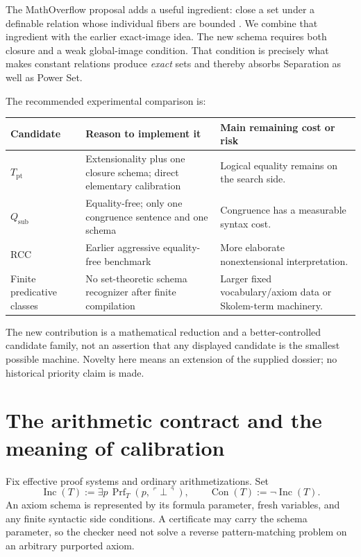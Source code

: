 \documentclass[11pt,letterpaper]{article}
\theoremstyle{definition}\newtheorem{definition}[theorem]{Definition}
\theoremstyle{remark}\newtheorem{remark}[theorem]{Remark}
\newcommand{\Con}{\operatorname{Con}}
\newcommand{\Inc}{\operatorname{Inc}}
\newcommand{\Prf}{\operatorname{Prf}}
\newcommand{\Tpt}{T_{\mathrm{pt}}}
\newcommand{\QTsub}{Q_{\mathrm{sub}}}
\begin{document}
The MathOverflow proposal adds a useful ingredient: close a set under a
definable relation whose individual fibers are bounded \cite{mo}.
We combine that ingredient with the earlier exact-image idea. The new
schema requires both closure and a weak global-image condition. That
condition is precisely what makes constant relations produce \emph{exact}
sets and thereby absorbs Separation as well as Power Set.

The recommended experimental comparison is:
\begin{center}
\begin{tabular}{p{.19\linewidth}p{.34\linewidth}p{.37\linewidth}}
\toprule
Candidate & Reason to implement it & Main remaining cost or risk\\
\midrule
$\Tpt$ & Extensionality plus one closure schema; direct elementary calibration & Logical equality remains on the search side.\\
$\QTsub$ & Equality-free; only one congruence sentence and one schema & Congruence has a measurable syntax cost.\\
RCC & Earlier aggressive equality-free benchmark & More elaborate nonextensional interpretation.\\
Finite predicative classes & No set-theoretic schema recognizer after finite compilation & Larger fixed vocabulary/axiom data or Skolem-term machinery.\\
\bottomrule
\end{tabular}
\end{center}

The new contribution is a mathematical reduction and a better-controlled
candidate family, not an assertion that any displayed candidate is the
smallest possible machine. Novelty here means an extension of the supplied
dossier; no historical priority claim is made.

\section{The arithmetic contract and the meaning of calibration}
\label{sec:contract}

Fix effective proof systems and ordinary arithmetizations. Set
\[
 \Inc(T):=\exists p\,\Prf_T(p,\ulcorner\bot\urcorner),
 \qquad \Con(T):=\neg\Inc(T).
\]
An axiom schema is represented by its formula parameter, fresh variables,
and any finite syntactic side conditions. A certificate may carry the
schema parameter, so the checker need not solve a reverse pattern-matching
problem on an arbitrary purported axiom.
\end{document}
